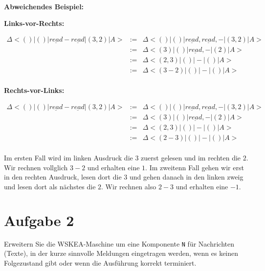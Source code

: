 \documentclass[11pt,a4paper,ngerman]{article}
\begin{document}
\textbf{Abweichendes Beispiel:}\\
\begin{description}
	\item{\bfseries Links-vor-Rechts:} 

$$
\begin{array}{rcl}
\Delta<()|()| \underline{read} - \underline{read} | (3,2) | A> &:=& \Delta<()|()| \underline{read}, \underline{read} , -| (3,2) | A>\\
	&:=& \Delta<(3)|()|\underline{read}, - | (2) | A>\\
	&:=& \Delta<(2,3)|()| - | () | A>\\
	&:=& \Delta<(3-2)|()| - | () | A>\\
\end{array}
$$

	\item{\bfseries Rechts-vor-Links:}

$$
\begin{array}{rcl}
\Delta<()|()| \underline{read} - \underline{read} | (3,2) | A> &:=& \Delta<()|()| \underline{read}, \underline{read} , -| (3,2) | A>\\
	&:=& \Delta<(3)|()|\underline{read}, - | (2) | A>\\
	&:=& \Delta<(2,3)|()| - | () | A>\\
	&:=& \Delta<(2-3)|()| - | () | A>\\
\end{array}
$$

Im ersten Fall wird im linken Ausdruck die $3$ zuerst gelesen und im rechten die $2$. Wir rechnen vollglich $3-2$ und erhalten eine $1$.
Im zweitenn Fall gehen wir erst in den rechten Ausdruck, lesen dort die $3$ und gehen danach in den linken zweig und lesen dort als nächstes die $2$. Wir rechnen also $2-3$ und erhalten eine $-1$.

\end{description}



\section*{Aufgabe 2}
Erweitern Sie die WSKEA-Maschine um eine Komponente \texttt{N} für Nachrichten (Texte), in der kurze sinnvolle Meldungen eingetragen werden, wenn es keinen Folgezustand gibt oder wenn die Ausführung korrekt terminiert.\\
\end{document}
